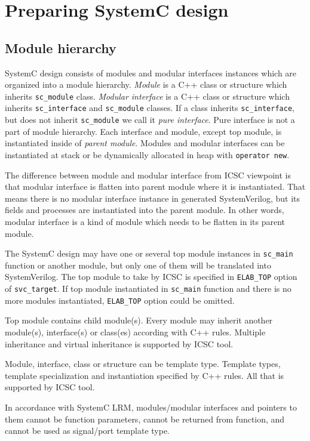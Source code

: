 \section{Preparing SystemC design}\label{section:prepare}

\subsection{Module hierarchy}\label{section:modules}

SystemC design consists of modules and modular interfaces instances which are organized into a module hierarchy. \emph{Module} is a C++ class or structure which inherits {\tt sc\_module} class. \emph{Modular interface} is a C++ class or structure which inherits {\tt sc\_interface} and {\tt sc\_module} classes. If a class inherits {\tt sc\_interface}, but does not inherit {\tt sc\_module} we call it \emph{pure interface}. Pure interface is not a part of module hierarchy. Each interface and module, except top module, is instantiated inside of \emph{parent module}. Modules and modular interfaces can be instantiated at stack or be dynamically allocated in heap with {\tt operator new}.

The difference between module and modular interface from ICSC viewpoint is that modular interface is flatten into parent module where it is instantiated. That means there is no modular interface instance in generated SystemVerilog, but its fields and processes are instantiated into the parent module. In other words, modular interface is a kind of module which needs to be flatten in its parent module.

The SystemC design may have one or several top module instances in {\tt sc\_main} function or another module, but only one of them will be translated into SystemVerilog. The top module to take by ICSC is specified in {\tt ELAB\_TOP} option of {\tt svc\_target}. If top module instantiated in {\tt sc\_main} function and there is no more modules instantiated, {\tt ELAB\_TOP} option could be omitted.
 
Top module contains child module(s). Every module may inherit another module(s), interface(s) or class(es) according with C++ rules. Multiple inheritance and virtual inheritance is supported by ICSC tool.

Module, interface, class or structure can be template type. Template types, template specialization and instantiation specified by C++ rules. All that is supported by ICSC tool.

In accordance with SystemC LRM, modules/modular interfaces and pointers to them cannot be function parameters, cannot be returned from function, and cannot be used as signal/port template type. 



